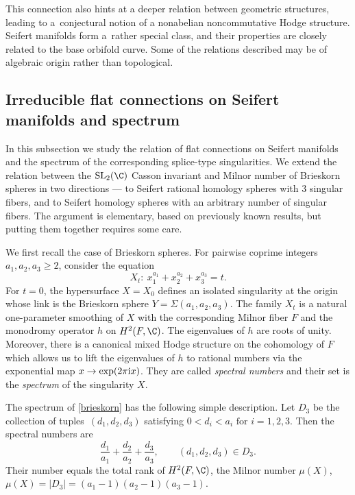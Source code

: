 \documentclass[10pt,a4paper]{amsart}
\begin{document}
This connection also hints at a deeper relation between geometric structures, leading to a~conjectural notion of a nonabelian noncommutative Hodge structure. Seifert manifolds form a~rather special class, and their properties are closely related to the base orbifold curve. Some of the relations described may be of algebraic origin rather than topological.

\subsection{Irreducible flat connections on Seifert manifolds and spectrum}

In this subsection we study the relation of flat connections on Seifert manifolds and the spectrum of the corresponding splice-type singularities. We extend the relation between the $\operatorname{SL}_2(\C)$ Casson invariant and Milnor number of Brieskorn spheres \cite[equation~(2.9)]{BC06} in two directions --- to Seifert rational homology spheres with 3 singular fibers, and to Seifert homology spheres with an arbitrary number of singular fibers. The argument is elementary, based on previously known results, but putting them together requires some care.

We first recall the case of Brieskorn spheres. For pairwise coprime integers $a_1,a_2,a_3 \geq 2$, consider the equation
\begin{equation}\label{brieskorn}
 X_t\colon\ x_1^{a_1}+x_2^{a_2}+x_3^{a_3}=t.
\end{equation}
For $t=0$, the hypersurface $X=X_0$ defines an isolated singularity at the origin whose link is the Brieskorn sphere $Y = \Sigma(a_1,a_2,a_3)$. The family $X_t$ is a natural one-parameter smoothing of $X$ with the corresponding Milnor fiber $F$ and the monodromy operator $h$ on $H^2(F,\C)$. The eigenvalues of $h$ are roots of unity. Moreover, there is a canonical mixed Hodge structure on the cohomology of $F$ which allows us to lift the eigenvalues of $h$ to rational numbers via the exponential map $x \to \exp(2\pi {\rm i} x)$. They are called \emph{spectral numbers} and their set is the \emph{spectrum} of the singularity $X$.

The spectrum of \eqref{brieskorn} has the following simple description. Let $D_3$ be the collection of tuples~${(d_1,d_2,d_3)}$ satisfying $0<d_i<a_i \text{ for } i = 1, 2, 3$. Then the spectral numbers are
\begin{equation}\label{spec_three}
	\frac{d_1}{a_1} + \frac{d_2}{a_2} + \frac{d_3}{a_3}, \qquad (d_1,d_2,d_3) \in D_3.
\end{equation}
Their number equals the total rank of $H^2(F,\C)$, the Milnor number $\mu(X)$,
$
\mu(X) = |D_3| = (a_1-1)(a_2-1)(a_3-1)$.
\end{document}
